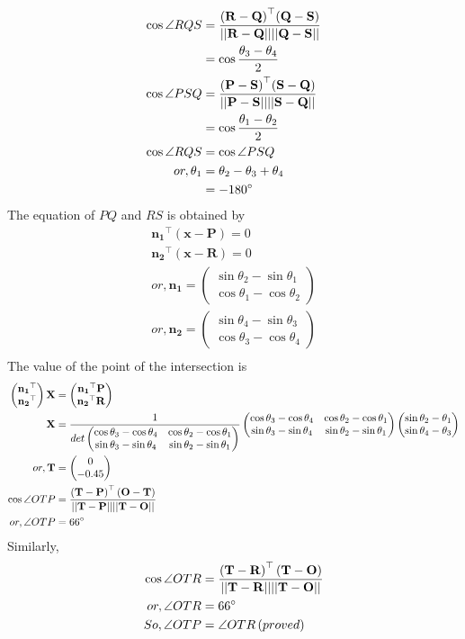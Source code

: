 \documentclass[12pt]{article}
\providecommand{\brak}[1]{\ensuremath{\left(#1\right)}}
\providecommand{\myvec}[1]{\ensuremath{\begin{pmatrix}#1\end{pmatrix}}}
\providecommand{\norm}[1]{\ensuremath{\lvert|#1\rvert|}}
\let\vec\mathbf
\begin{document}
\begin{align}
  \cos{\angle RQS}&=\frac{\vec{\brak{R-Q}}^{\top}\vec{\brak{Q-S}}}{\vec{\norm{R-Q}\norm{Q-S}}}\\
  &=\cos{\frac{\theta_3-\theta_4}{2}}\\
   \cos{\angle PSQ}&=\frac{\vec{\brak{P-S}}^{\top}\vec{\brak{S-Q}}}{\vec{\norm{P-S}\norm{S-Q}}}\\
  &=\cos{\frac{\theta_1-\theta_2}{2}}\\
   \cos{\angle RQS}&=\cos{\angle PSQ}\\
   or,\theta_1&=\theta_2-\theta_3+\theta_4\\
   &=-180\degree
  \end{align}
The equation of $PQ$ and $RS$ is obtained by
\begin{align}
  \vec{n_1}^{\top}\vec{\brak{x-P}}=0\\
  \vec{n_2}^{\top}\vec{\brak{x-R}}=0\\
  or,\vec{n_1}=\myvec{\sin{\theta_2}-\sin{\theta_1}\\\cos{\theta_1}-\cos{\theta_2}}\\
  or,\vec{n_2}=\myvec{\sin{\theta_4}-\sin{\theta_3}\\\cos{\theta_3}-\cos{\theta_4}}\\
 \end{align}
  The value of the point of the intersection is
\begin{align}
\myvec{\vec{n_1}^{\top}\\\vec{n_2}^{\top}}\vec{X}&=\myvec{\vec{n_1}^{\top}\vec{P}\\\vec{n_2}^{\top}\vec{R}}\\
\vec{X}&=\frac{1}{det\myvec{\cos{\theta_3}-\cos{\theta_4}&\cos{\theta_2}-\cos{\theta_1}\\\sin{\theta_3}-\sin{\theta_4}&\sin{\theta_2}-\sin{\theta_1}}}\myvec{\cos{\theta_3}-\cos{\theta_4}&\cos{\theta_2}-\cos{\theta_1}\\\sin{\theta_3}-\sin{\theta_4}&\sin{\theta_2}-\sin{\theta_1}}\myvec{\sin{\theta_2-\theta_1}\\\sin{\theta_4-\theta_3}}\\
or,\vec{T} &= \myvec{0\\-0.45}\\
\cos{\angle OTP} &= \frac{\brak{\vec{T-P}}^{\top}\brak{\vec{O-T}}}{\vec{\norm{T-P}\norm{T-O}}}\\
or, \angle OTP&= 66\degree
\end{align}
Similarly,
\begin{align}
   \cos{\angle OTR} &= \frac{\brak{\vec{T-R}}^{\top}\brak{\vec{T-O}}}{\vec{\norm{T-R}\norm{T-O}}}\\
or, \angle OTR&= 66\degree \\
So,\angle OTP &= \angle OTR \brak{proved}
\end{align}
\end{document}
